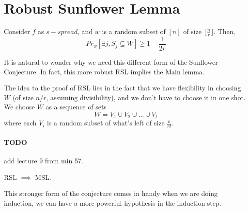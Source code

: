 \section{Robust Sunflower Lemma}
\begin{lemma}
	Consider $f$ as $s-spread$, and $w$ is a random subset of $[n]$ of size $\lfloor \frac{n}{r} \rfloor$. Then, 
	\begin{equation}
		Pr_{w} [\exists j, S_j \subseteq W] \geq 1 - \frac{1}{2r}
	\end{equation}
\end{lemma}

It is natural to wonder why we need this different form of the Sunflower Conjecture. In fact, this more robust RSL implies the Main lemma. 

The idea to the proof of RSL lies in the fact that we have flexibility in choosing $W$ (of size $n/r$, assuming divisibility), and we don't have to choose it in one shot. We choose $W$ as a sequence of sets
\begin{equation}
	W = V_1 \cup V_2 \cup \dots \cup V_t
\end{equation}
where each $V_i$ is a random subset of what's left of size $\frac{n}{rt}$. 

\paragraph{TODO} add lecture 9 from min 57. 
%
%


\begin{proposition}
	RSL $\implies$ MSL. 
\end{proposition}
This stronger form of the conjecture comes in handy when we are doing induction, we can have a more powerful hypothesis in the induction step. 

